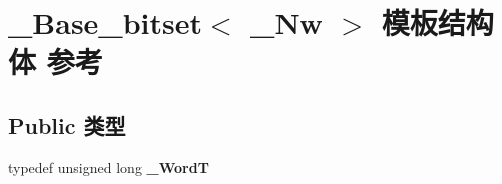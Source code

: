 \hypertarget{struct___base__bitset}{}\section{\+\_\+\+Base\+\_\+bitset$<$ \+\_\+\+Nw $>$ 模板结构体 参考}
\label{struct___base__bitset}
\subsection*{Public 类型}
\begin{DoxyCompactItemize}
\item 
\mbox{\label{struct___base__bitset_a4c4a96460c688c2d9a56b09658683892}} 
typedef unsigned long {\bfseries \+\_\+\+WordT}
\end{DoxyCompactItemize}
